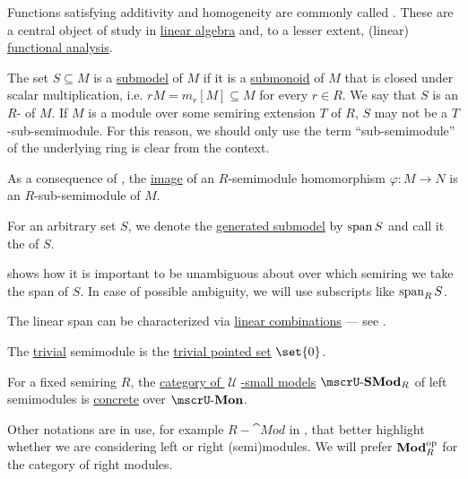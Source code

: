 \begin{definition}
\begin{thmenum}[resume=def:semimodule]
    Functions satisfying additivity and homogeneity are commonly called . These are a central object of study in \hyperref[sec:linear_algebra]{linear algebra} and, to a lesser extent, (linear) \hyperref[sec:functional_analysis]{functional analysis}.

     The set \( S \subseteq M \) is a \hyperref[thm:substructure_is_model]{submodel} of \( M \) if it is a \hyperref[def:monoid/submodel]{submonoid} of \( M \) that is closed under scalar multiplication, i.e. \( rM = m_r[M] \subseteq M \) for every \( r \in R \). We say that \( S \) is an \( R \)- of \( M \). If \( M \) is a module over some semiring extension \( T \) of \( R \), \( S \) may not be a \( T \)-sub-semimodule. For this reason, we should only use the term \enquote{sub-semimodule} of the underlying ring is clear from the context.

    As a consequence of , the \hyperref[def:multi_valued_function/image]{image} of an \( R \)-semimodule homomorphism \( \varphi: M \to N \) is an \( R \)-sub-semimodule of \( M \).

    For an arbitrary set \( S \), we denote the \hyperref[def:first_order_generated_substructure]{generated submodel} by \( \operatorname{span}{ S } \) and call it the  of \( S \).

     shows how it is important to be unambiguous about over which semiring we take the span of \( S \). In case of possible ambiguity, we will use subscripts like \( \operatorname{span}_R S \).

    The linear span can be characterized via \hyperref[def:linear_combination]{linear combinations} --- see .

     The \hyperref[thm:substructures_form_complete_lattice/bottom]{trivial} semimodule is the \hyperref[def:pointed_set/trivial]{trivial pointed set} \( \set{ 0 } \).

     For a fixed semiring \( R \), the \hyperref[def:category_of_small_first_order_models]{category of \( \mscrU \)-small models} \( \ucat{SMod}_R \) of left semimodules is \hyperref[def:concrete_category]{concrete} over \hyperref[def:monoid]{\( \ucat{Mon} \)}.

    Other notations are in use, for example \( R-\cat{Mod} \) in \cite[158]{Aluffi2009}, that better highlight whether we are considering left or right (semi)modules. We will prefer \( \operatorname{\mathbf{Mod}}_R^{\operatorname{op}} \) for the category of right modules.
  \end{thmenum}
\end{definition}
